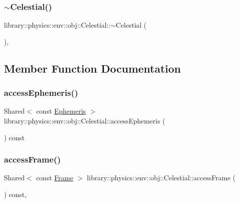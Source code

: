 \subsubsection{\texorpdfstring{$\sim$\+Celestial()}{~Celestial()}}
{\footnotesize\ttfamily library\+::physics\+::env\+::obj\+::\+Celestial\+::$\sim$\+Celestial (\begin{DoxyParamCaption}{ }\end{DoxyParamCaption})\hspace{0.3cm}{\ttfamily [override]}, {\ttfamily [virtual]}}



\subsection{Member Function Documentation}
\mbox{\label{classlibrary_1_1physics_1_1env_1_1obj_1_1_celestial_ab56fff3f2f1508dee79fa7410d67e300}} 
\subsubsection{\texorpdfstring{access\+Ephemeris()}{accessEphemeris()}}
{\footnotesize\ttfamily Shared$<$ const \hyperlink{classlibrary_1_1physics_1_1env_1_1_ephemeris}{Ephemeris} $>$ library\+::physics\+::env\+::obj\+::\+Celestial\+::access\+Ephemeris (\begin{DoxyParamCaption}{ }\end{DoxyParamCaption}) const}

\mbox{\label{classlibrary_1_1physics_1_1env_1_1obj_1_1_celestial_a6649bfe0bf0795aa4def046a8c38aef5}} 
\subsubsection{\texorpdfstring{access\+Frame()}{accessFrame()}}
{\footnotesize\ttfamily Shared$<$ const \hyperlink{classlibrary_1_1physics_1_1coord_1_1_frame}{Frame} $>$ library\+::physics\+::env\+::obj\+::\+Celestial\+::access\+Frame (\begin{DoxyParamCaption}{ }\end{DoxyParamCaption}) const\hspace{0.3cm}{\ttfamily [override]}, {\ttfamily [virtual]}}



